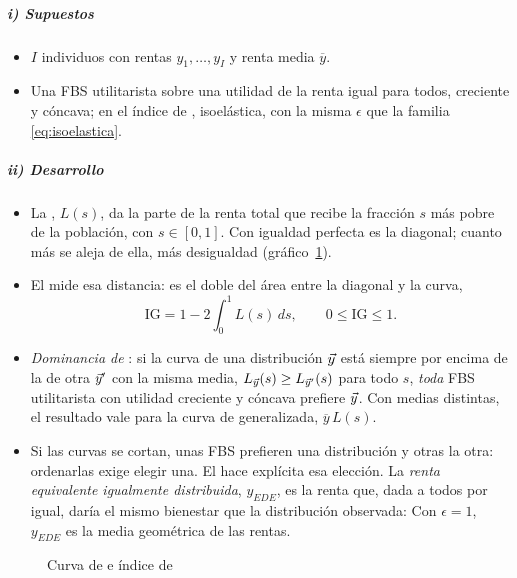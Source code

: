 \documentclass[11pt]{article}
\begin{document}
\subparagraph{i) Supuestos}

\begin{itemize}
\item $I$ individuos con rentas $y_1,\dots,y_I$ y renta media $\overline{y}$.
\item Una FBS utilitarista sobre una utilidad de la renta igual para todos, creciente y cóncava; en el índice de , isoelástica, con la misma $\epsilon$ que la familia \eqref{eq:isoelastica}.
\end{itemize}

\subparagraph{ii) Desarrollo}

\begin{itemize}
\item La , $L(s)$, da la parte de la renta total que recibe la fracción $s$ más pobre de la población, con $s\in[0,1]$. Con igualdad perfecta es la diagonal; cuanto más se aleja de ella, más desigualdad (gráfico~\ref{fig:lorenz}).
\item El  mide esa distancia: es el doble del área entre la diagonal y la curva,
  \begin{equation}\label{eq:gini}
  \mathrm{IG}=1-2\int_0^1L(s)\,ds,\qquad 0\leq\mathrm{IG}\leq1.
  \end{equation}
\item \emph{Dominancia de }\nocite{Atkinson1970Measurement}: si la curva de una distribución $\vec{y}$ está siempre por encima de la de otra $\vec{y}'$ con la misma media, $L_{\vec{y}}(s)\geq L_{\vec{y}'}(s)$ para todo $s$, \emph{toda} FBS utilitarista con utilidad creciente y cóncava prefiere $\vec{y}$. Con medias distintas, el resultado vale para la curva de  generalizada, $\overline{y}\,L(s)$\nocite{Shorrocks1983Ranking}.
\item Si las curvas se cortan, unas FBS prefieren una distribución y otras la otra: ordenarlas exige elegir una. El  hace explícita esa elección. La \emph{renta equivalente igualmente distribuida}, $y_{EDE}$, es la renta que, dada a todos por igual, daría el mismo bienestar que la distribución observada:
  Con $\epsilon=1$, $y_{EDE}$ es la media geométrica de las rentas.
\end{itemize}

\begin{figure}[H]
\centering
\caption{Curva de  e índice de }\label{fig:lorenz}
\end{figure}
\end{document}
